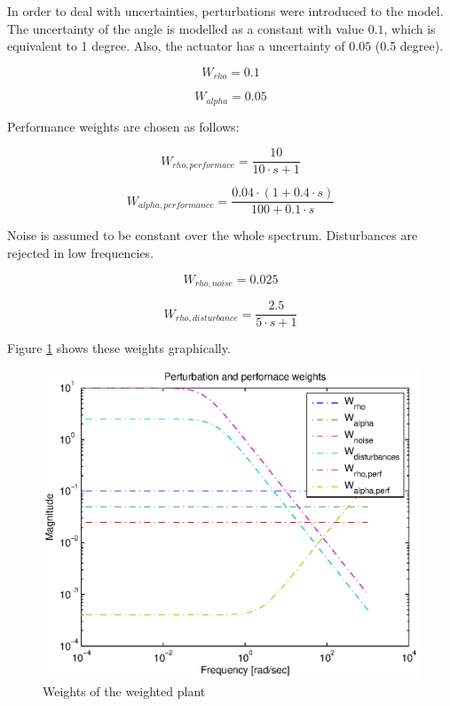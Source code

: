 \documentclass[conference]{IEEEtran}
\begin{document}
In order to deal with uncertainties, perturbations were introduced to the model. The uncertainty of the angle is modelled as a constant with value $0.1$, which is equivalent to 1 degree. Also, the actuator has a uncertainty of $0.05$ (0.5 degree).

\begin{equation}
\label{eg:W_rho}
{W_{rho}} = 0.1
\end{equation}

\begin{equation}
{W_{alpha}} = 0.05
\end{equation}

Performance weights are chosen as follows:

\begin{equation}
{W_{rho,performace}} = \frac{{10}}{{10 \cdot s + 1}}
\end{equation}

\begin{equation}
{W_{alpha,performance}} = \frac{{0.04 \cdot \left( {1 + 0.4 \cdot s} \right)}}{{100 + 0.1 \cdot s}}
\end{equation}

Noise is assumed to be constant over the whole spectrum. Disturbances are rejected in low frequencies.

\begin{equation}
{W_{rho,noise}} = 0.025
\end{equation}

\begin{equation}
{W_{rho,disturbance}} = \frac{{2.5}}{{5 \cdot s + 1}}
\end{equation}

Figure \ref{figure:weights} shows these weights graphically.

\begin{figure}[h]
\centering
  \includegraphics[width=.47\textwidth]{pics/weights.eps} 
  \caption{Weights of the weighted plant}  
  \label{figure:weights}
\end{figure}
\end{document}
